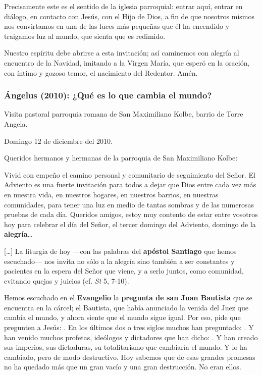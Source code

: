 Precisamente este es el sentido de la iglesia parroquial: entrar aquí, entrar en diálogo, en contacto con Jesús, con el Hijo de Dios, a fin de que nosotros mismos nos convirtamos en una de las luces más pequeñas que él ha encendido y traigamos luz al mundo, que sienta que es redimido.

Nuestro espíritu debe abrirse a esta invitación; así caminemos con alegría al encuentro de la Navidad, imitando a la Virgen María, que esperó en la oración, con íntimo y gozoso temor, el nacimiento del Redentor. Amén.

\subsubsection{Ángelus (2010): ¿Qué es lo que cambia el mundo?}

Visita pastoral parroquia romana de San Maximiliano Kolbe, barrio de Torre Angela.

Domingo 12 de diciembre del 2010.

Queridos hermanos y hermanas de la parroquia de San Maximiliano Kolbe:

Vivid con empeño el camino personal y comunitario de seguimiento del Señor. El Adviento es una fuerte invitación para todos a dejar que Dios entre cada vez más en nuestra vida, en nuestros hogares, en nuestros barrios, en nuestras comunidades, para tener una luz en medio de tantas sombras y de las numerosas pruebas de cada día. Queridos amigos, estoy muy contento de estar entre vosotros hoy para celebrar el día del Señor, el tercer domingo del Adviento, domingo de la \textbf{alegría}\ldots{}

[\ldots{}] La liturgia de hoy ---con las palabras del \textbf{apóstol Santiago} que hemos escuchado--- nos invita no sólo a la alegría sino también a ser constantes y pacientes en la espera del Señor que viene, y a serlo juntos, como comunidad, evitando quejas y juicios (cf. \emph{St} 5, 7-10).

Hemos escuchado en el \textbf{Evangelio} la \textbf{pregunta de san Juan Bautista} que se encuentra en la cárcel; el Bautista, que había anunciado la venida del Juez que cambia el mundo, y ahora siente que el mundo sigue igual. Por eso, pide que pregunten a Jesús: . En los últimos dos o tres siglos muchos han preguntado: . Y han venido muchos profetas, ideólogos y dictadores que han dicho: . Y han creado sus imperios, sus dictaduras, su totalitarismo que cambiaría el mundo. Y lo ha cambiado, pero de modo destructivo. Hoy sabemos que de esas grandes promesas no ha quedado más que un gran vacío y una gran destrucción. No eran ellos.

